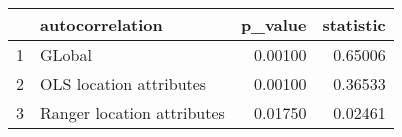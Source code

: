 \begin{table}[ht]
\centering
\begin{tabular}{rlrr}
  \hline
 & autocorrelation & p\_value & statistic \\ 
  \hline
1 & GLobal & 0.00100 & 0.65006 \\ 
  2 & OLS location attributes & 0.00100 & 0.36533 \\ 
  3 & Ranger location attributes & 0.01750 & 0.02461 \\ 
   \hline
\end{tabular}
\end{table}
